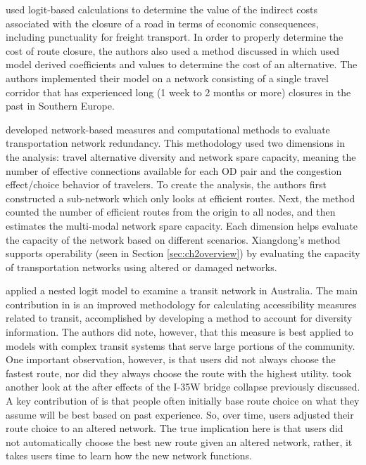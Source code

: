 \citet{Masiero2012} used logit-based calculations to determine the value of the
indirect costs associated with the closure of a road in terms of economic consequences, including
punctuality for freight transport. In order to properly determine the
cost of route closure, the authors also used a method discussed in
\citet{koppelman2006} which used model derived coefficients and values to
determine the cost of an alternative. The authors implemented their
model on a network consisting of a single travel corridor that has
experienced long (1 week to 2 months or more) closures in the past in Southern Europe.

\citet{xiangdong2015} developed network-based measures and computational
methods to evaluate transportation network redundancy. This methodology used
two dimensions in the analysis: travel alternative diversity and network spare
capacity, meaning the number of effective connections available for each OD
pair and the congestion effect/choice behavior of travelers. To create the
analysis, the authors first constructed a sub-network which only looks at
efficient routes. Next, the method counted the number of efficient routes
from the origin to all nodes, and then estimates the multi-modal network
spare capacity. Each dimension helps evaluate the capacity of the network
based on different scenarios. Xiangdong's method supports operability
(seen in Section \ref{sec:ch2overview}) by evaluating the capacity of
transportation networks using altered or damaged networks.

\citet{Nassir2016} applied a nested logit model to examine a transit
network in Australia. The main contribution in \citet{Nassir2016} is an
improved methodology for calculating accessibility measures related to
transit, accomplished by developing a method to account for diversity
information. The authors did note, however, that this measure is best applied
to models with complex transit systems that serve large portions of the
community. One important observation, however, is that users did not always
choose the fastest route, nor did they always choose the route with the
highest utility. \citet{He2012} took another look at the after effects of
the I-35W bridge collapse previously discussed. A key contribution of
\citet{He2012} is that people often initially base route choice on what they
assume will be best based on past experience. So, over time, users
adjusted their route choice to an altered network. The true implication here
is that users did not automatically choose the best new route given an
altered network, rather, it takes users time to learn how the new network
functions.


